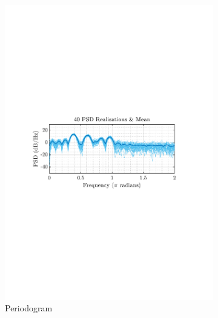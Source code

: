 \documentclass[12pt]{article}
\begin{document}
	\begin{figure}[H]
		\centering
		\begin{subfigure}{0.49\textwidth}
			\centering
			\includegraphics[trim={2.2cm 11.2cm 3.15cm  11.2cm}, clip, width=\textwidth]{../MATLAB/figures/q1_3c_fig01.pdf} 
			\captionsetup{justification=centering}
			\caption{Periodogram}
		\end{subfigure}
		\begin{subfigure}{0.49\textwidth}
			\centering

\end{subfigure}
\end{figure}
\end{document}
